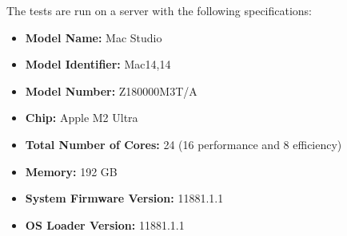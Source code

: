 The tests are run on a server with the following specifications:
\begin{itemize}
    \item \textbf{Model Name:} Mac Studio
    \item \textbf{Model Identifier:} Mac14,14
    \item \textbf{Model Number:} Z180000M3T/A
    \item \textbf{Chip:} Apple M2 Ultra
    \item \textbf{Total Number of Cores:} 24 (16 performance and 8 efficiency)
    \item \textbf{Memory:} 192 GB
    \item \textbf{System Firmware Version:} 11881.1.1
    \item \textbf{OS Loader Version:} 11881.1.1
\end{itemize}

